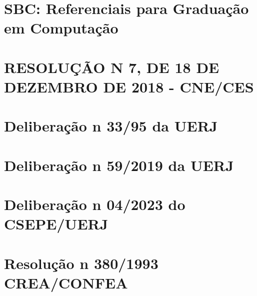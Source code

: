 \chapter{SBC: Referenciais para Graduação em Computação}
\label{sbc2017}

\chapter{RESOLUÇÃO N\textordmasculine{} 7, DE 18 DE DEZEMBRO DE 2018 - CNE/CES}
\label{rcne2018}

\chapter{Deliberação n\textordmasculine{} 33/95 da UERJ}
\label{delib3395}

\chapter{Deliberação n\textordmasculine{} 59/2019 da UERJ}
\label{delib592019}

\chapter{Deliberação n\textordmasculine{} 04/2023 do CSEPE/UERJ}
\label{del4}

\chapter{Resolução n\textordmasculine{} 380/1993 CREA/CONFEA}
\label{confea1993}

